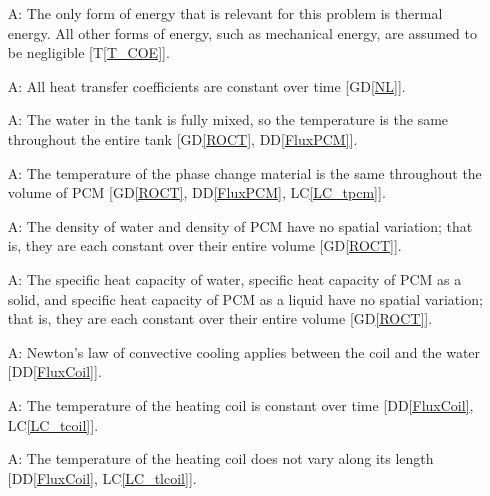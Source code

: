 \documentclass[12pt]{article}
\newcommand{\dref}[1]{GD\ref{#1}}
\newcommand{\ddref}[1]{DD\ref{#1}}
\newcommand{\tref}[1]{T\ref{#1}}
\newcounter{assumpnum} %
\newcommand{\lcref}[1]{LC\ref{#1}}
\begin{document}
\begin{itemize}

\item[A\refstepcounter{assumpnum}\theassumpnum \label{A_OnlyThermalEnergy}:] The
  only form of energy that is relevant for this problem is thermal energy.  All
  other forms of energy, such as mechanical energy, are assumed to be
  negligible [\tref{T_COE}].

\item[A\refstepcounter{assumpnum}\theassumpnum \label{A_hcoeff}:] All heat
  transfer coefficients are constant over time [\dref{NL}].

\item[A\refstepcounter{assumpnum}\theassumpnum \label{A_mixed}:] The water in
  the tank is fully mixed, so the temperature is the same throughout the entire
  tank [\dref{ROCT}, \ddref{FluxPCM}].

\item[A\refstepcounter{assumpnum}\theassumpnum \label{A_tpcm}:] The temperature
  of the phase change material is the same throughout the volume of PCM
  [\dref{ROCT}, \ddref{FluxPCM}, \lcref{LC_tpcm}].

\item[A\refstepcounter{assumpnum}\theassumpnum \label{A_const_density}:] The
  density of water and density of PCM have no spatial variation; that is, they
  are each constant over their entire volume [\dref{ROCT}].

\item[A\refstepcounter{assumpnum}\theassumpnum \label{A_const_C}:] The specific
  heat capacity of water, specific heat capacity of PCM as a solid, and specific
  heat capacity of PCM as a liquid have no spatial variation; that is, they are
  each constant over their entire volume  [\dref{ROCT}].

\item[A\refstepcounter{assumpnum}\theassumpnum \label{A_Newt_coil}:] Newton's
  law of convective cooling applies between the coil and the water [\ddref{FluxCoil}].
	
\item[A\refstepcounter{assumpnum}\theassumpnum \label{A_tcoil}:] The temperature
  of the heating coil is constant over time [\ddref{FluxCoil}, \lcref{LC_tcoil}].
	
\item[A\refstepcounter{assumpnum}\theassumpnum \label{A_tlcoil}:] The
  temperature of the heating coil does not vary along its
  length [\ddref{FluxCoil}, \lcref{LC_tlcoil}].


\end{itemize}
\end{document}
